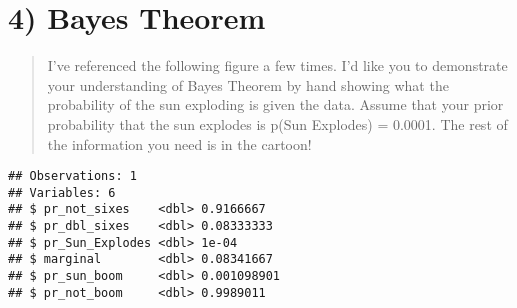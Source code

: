 \documentclass[]{article}
\newenvironment{Shaded}{\begin{snugshade}}{\end{snugshade}}
\newcommand{\KeywordTok}[1]{\textcolor[rgb]{0.13,0.29,0.53}{\textbf{#1}}}
\newcommand{\DataTypeTok}[1]{\textcolor[rgb]{0.13,0.29,0.53}{#1}}
\newcommand{\DecValTok}[1]{\textcolor[rgb]{0.00,0.00,0.81}{#1}}
\newcommand{\FloatTok}[1]{\textcolor[rgb]{0.00,0.00,0.81}{#1}}
\newcommand{\StringTok}[1]{\textcolor[rgb]{0.31,0.60,0.02}{#1}}
\newcommand{\OtherTok}[1]{\textcolor[rgb]{0.56,0.35,0.01}{#1}}
\newcommand{\OperatorTok}[1]{\textcolor[rgb]{0.81,0.36,0.00}{\textbf{#1}}}
\newcommand{\NormalTok}[1]{#1}
\begin{document}
\section{4) Bayes Theorem}\label{bayes-theorem}

\begin{quote}
I've referenced the following figure a few times. I'd like you to
demonstrate your understanding of Bayes Theorem by hand showing what the
probability of the sun exploding is given the data. Assume that your
prior probability that the sun explodes is p(Sun Explodes) = 0.0001. The
rest of the information you need is in the cartoon!
\end{quote}

\begin{Shaded}
\end{Shaded}

\begin{verbatim}
## Observations: 1
## Variables: 6
## $ pr_not_sixes    <dbl> 0.9166667
## $ pr_dbl_sixes    <dbl> 0.08333333
## $ pr_Sun_Explodes <dbl> 1e-04
## $ marginal        <dbl> 0.08341667
## $ pr_sun_boom     <dbl> 0.001098901
## $ pr_not_boom     <dbl> 0.9989011
\end{verbatim}
\end{document}
